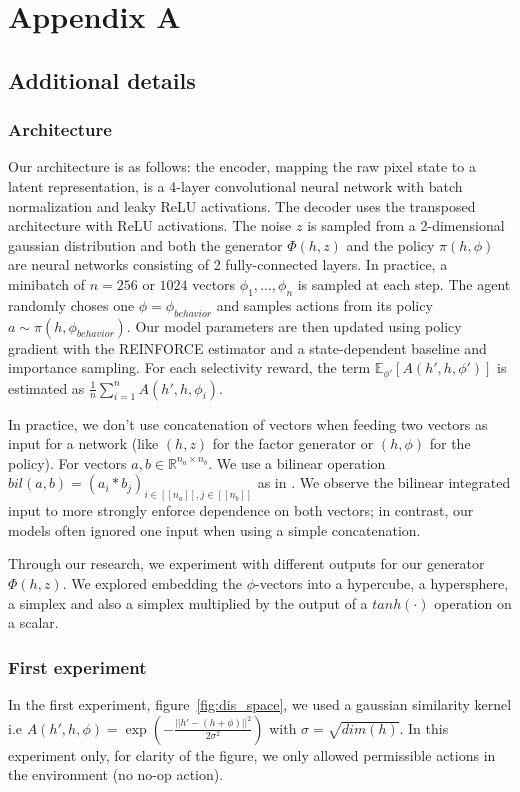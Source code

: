 \chapter{Appendix A}
\section{Additional details}
\subsection{Architecture}
Our architecture is as follows: the encoder, mapping the raw pixel state to a latent representation, is a 4-layer convolutional neural network with batch normalization \citep{ioffe2015batch} and leaky ReLU activations. The decoder uses the transposed architecture with ReLU activations. The noise $z$ is sampled from a 2-dimensional gaussian distribution and both the generator $\Phi(h,z)$ and the policy $\pi(h,\phi)$ are neural networks consisting of 2 fully-connected layers. In practice, a minibatch of $n = 256$ or $1024$ vectors $\phi_1, \dots, \phi_{n}$ is sampled at each step. The agent randomly choses one $\phi = \phi_{behavior}$ and samples actions from its policy $a \sim \pi(h, \phi_{behavior})$. Our model parameters are then updated using policy gradient with the REINFORCE estimator and a state-dependent baseline and importance sampling. For each selectivity reward, the term $\mathbb{E}_{\phi'}[  A(h', h,\phi')]$ is estimated as $\tfrac{1}{n} \sum_{i = 1}^n A(h', h,\phi_i)$.

In practice, we don't use concatenation of vectors when feeding two vectors as input for a network (like $(h, z)$ for the factor generator or $(h, \phi)$ for the policy).
For vectors $a,b \in \mathbb{R}^{n_a \times n_b}$. We use a bilinear operation $bil(a, b) = (a_i * b_j)_{i \in [[n_a]], j \in [[n_b]]}$ as in \cite{florensa2017stochastic}.  We observe the bilinear integrated input to more strongly enforce dependence on both vectors; in contrast, our models often ignored one input when using a simple concatenation.

Through our research, we experiment with different outputs for our generator $\Phi(h,z)$.  We explored embedding the $\phi$-vectors into a hypercube, a hypersphere, a simplex and also a simplex multiplied by the output of a $tanh(\cdot)$ operation on a scalar.

\subsection{First experiment}
In the first experiment, figure~\ref{fig:dis_space}, we used a gaussian similarity kernel i.e $A(h', h, \phi) = \exp(- \frac{||h' - (h+\phi)||^2}{2 \sigma^2})$ with $\sigma = \sqrt{dim(h)}$.
In this experiment only, for clarity of the figure, we only allowed permissible actions in the environment (no no-op action).


